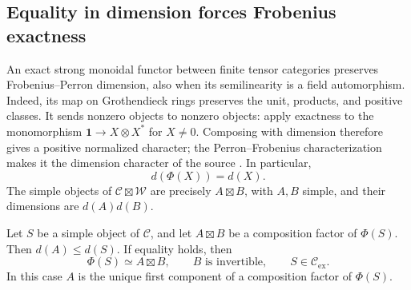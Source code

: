 \subsection{Equality in dimension forces Frobenius exactness}

An exact strong monoidal functor between finite tensor categories preserves
Frobenius--Perron dimension, also when its semilinearity is a field
automorphism.  Indeed, its map on Grothendieck rings preserves the unit,
products, and positive classes.  It sends nonzero objects to nonzero
objects: apply exactness to the monomorphism
\(\mathbf1\to X\otimes X^*\) for \(X\ne0\).
Composing with dimension therefore gives a positive normalized character;
the Perron--Frobenius characterization makes it the dimension character
of the source \cite[Propositions~3.3.6, 3.3.13, and~4.5.7]{EGNO2015}.  In particular,
\[
 d(\Phi(X))=d(X).
\]
The simple objects of \(\mathcal C\boxtimes\mathcal W\) are precisely
\(A\boxtimes B\), with \(A,B\) simple, and their dimensions are
\(d(A)d(B)\).

\begin{lemma}\label{lem:equality-descent}
Let \(S\) be a simple object of \(\mathcal C\), and let
\(A\boxtimes B\) be a composition factor of \(\Phi(S)\).
Then \(d(A)\leq d(S)\).  If equality holds, then
\[
 \Phi(S)\simeq A\boxtimes B,\qquad B\text{ is invertible},
 \qquad S\in\mathcal C_{\mathrm{ex}}.
\]
In this case \(A\) is the unique first component of a composition factor
of \(\Phi(S)\).
\end{lemma}

